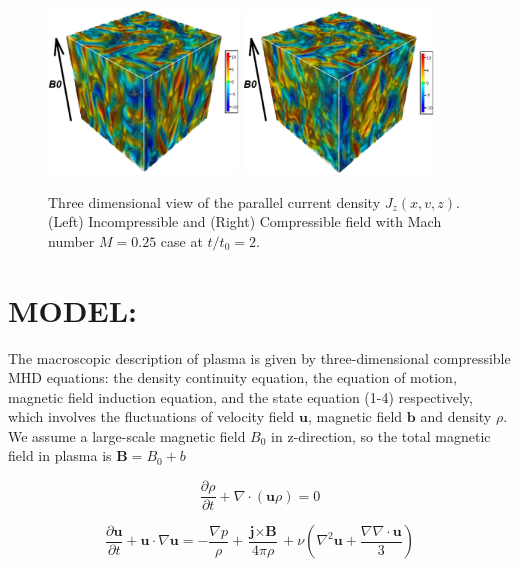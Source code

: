 \documentclass[%
aip,pop,amsmath,amssymb,
 reprint,%
]{revtex4-1}
\begin{document}
\begin{figure}[<t>]
\begin{center}
{\includegraphics[width = 0.45\textwidth]{./Figures/Fig1_a}}
{\includegraphics[width = 0.45\textwidth]{./Figures/Fig1_b}}
\caption{Three dimensional view of the parallel current density $J_z(x,v,z)$. (Left) Incompressible and 
(Right) Compressible field with Mach number $M=0.25$ case at $t/t_0 =2$.}
\end{center}
\end{figure}


\section{\label{sec:level2}MODEL:}
The macroscopic description of plasma is given by three-dimensional compressible MHD equations: the density continuity equation, the equation of motion, magnetic field induction equation, and the state equation (1-4) respectively, which involves the fluctuations  of velocity field $\textbf{u}$, magnetic field $\textbf{b}$ and density $\rho$. We assume a large-scale magnetic field $B_0$ in z-direction, so the total magnetic field in plasma is $\textbf{B} = B_0 + b$

\begin{equation}
 \frac{\partial \rho}{\partial t} + \nabla \cdot (\textbf{u}\rho) = 0
\end{equation}

\begin{equation}
 \frac{\partial \textbf{u}}{\partial t} + \textbf{u} \cdot \nabla \textbf{u} = - \frac{\nabla p}{\rho} + \frac{\textbf{j} \times \textbf{B}}{4\pi\rho} 
 + \nu \left( \nabla^2 \textbf{u} +    \frac{\nabla \nabla \cdot \textbf{u} }{3} \right)
\end{equation}
\end{document}

